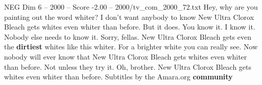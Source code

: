 \begin{textsample}{NEG Dim 6 – 2000 – Score -2.00 – 2000/tv\_com\_2000\_72.txt}  \label{ex:f6_neg_002}
Hey, why are you painting out the word whiter?
I don't want anybody to know New Ultra Clorox Bleach gets whites even whiter than before.
But it does.
You know it.
I know it.
Nobody else needs to know it.
Sorry, fellas.
New Ultra Clorox Bleach gets even the \textbf{dirtiest} whites like this whiter.
For a brighter white you can really see.
Now nobody will ever know that New Ultra Clorox Bleach gets whites even whiter than before.
Not unless they try it.
Oh, brother.
New Ultra Clorox Bleach gets whites even whiter than before.
Subtitles by the Amara.org \textbf{community}

\end{textsample}
